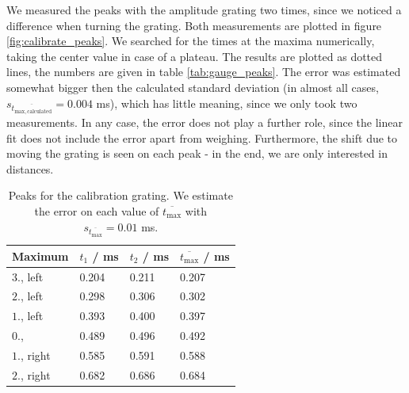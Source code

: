 We measured the peaks with the amplitude grating two times, since we noticed a difference when turning the grating. 
Both measurements are plotted in figure \ref{fig:calibrate_peaks}. 
We searched for the times at the maxima numerically, taking the center value in case of a plateau. 
The results are plotted as dotted lines, the numbers are given in table \ref{tab:gauge_peaks}. 
The error was estimated somewhat bigger then the calculated standard deviation (in almost 
    all cases, $s_{\overline{t_\mathrm{max, calculated}}}  = 0.004$ ms), which has little meaning, 
since we only took two measurements. In any case, the error does not play a further role, 
since the linear fit does not include the error apart from weighing. Furthermore, the 
shift due to moving the grating is seen on each peak - in the 
end, we are only interested in distances.  
\renewcommand{\arraystretch}{1.5}
\begin{table}[htdp]
    \centering
    \begin{tabular}{|p{3cm}|p{2cm}|p{2cm}|p{2cm}|}
        \hline
        \rowcolor{LightCyan}
        Maximum & $t_1$ / ms & $t_2$  / ms & $\overline{t_\mathrm{max}}$ / ms \\ \hline
        $3.$, left  & 0.204     & 0.211 & 0.207 \\
        $2.$, left  & 0.298     & 0.306 & 0.302 \\
        $1.$, left  & 0.393     & 0.400 & 0.397 \\
        $0.$,       & 0.489     & 0.496 & 0.492 \\
        $1.$, right & 0.585     & 0.591 & 0.588 \\
        $2.$, right & 0.682     & 0.686 & 0.684 \\
        \hline
    \end{tabular}
    \caption{
        Peaks for the calibration grating. We estimate the error on each 
        value of $\overline{t_\mathrm{max}}$ with 
        $s_{\overline{t_\mathrm{max}}} = 0.01$ ms.
        }
    \label{tab:calibrate_peaks}
\end{table}

